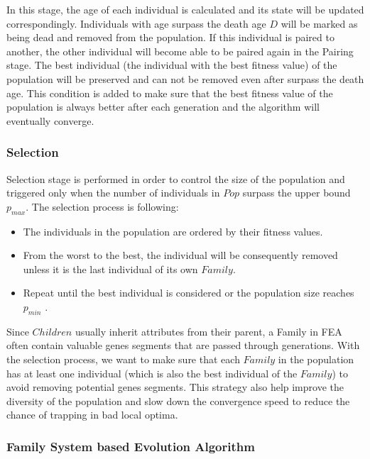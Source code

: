 \documentclass[final]{elsarticle}
\begin{document}
In this stage, the age of each individual is calculated and its state will be updated correspondingly. Individuals with age surpass the death age $D$ will be marked as being dead and removed from the population. If this individual is paired to another, the other individual will become able to be paired again in the Pairing stage. The best individual (the individual with the best fitness value) of the population will be preserved and can not be removed even after surpass the death age. This condition is added to make sure that the best fitness value of the population is always better after each generation and the algorithm will eventually converge.

\subsubsection{Selection}

Selection stage is performed in order to control the size of the population and triggered only when the number of individuals in $Pop$ surpass the upper bound $p_{max}$. The selection process is following: 
\begin{itemize}
	\item The individuals in the population are ordered by their fitness values. \\
	\item From the worst to the best, the individual will be consequently removed unless it is the last individual of its own $ Family $. \\
	\item Repeat until the best individual is considered or the population size reaches $p_{min}$ .\\
\end{itemize}
Since $Children$ usually inherit attributes from their parent, a Family in FEA often contain valuable genes segments that are passed through generations. With the selection process, we want to make sure that each $ Family $ in the population has at least one individual (which is also the best individual of the $ Family $) to avoid removing potential genes segments. This strategy also help improve the diversity of the population and slow down the convergence speed to reduce the chance of trapping in bad local optima.

\subsubsection{Family System based Evolution Algorithm}
\end{document}
